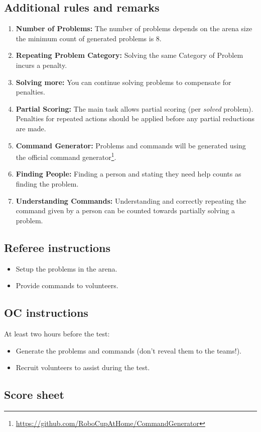 \subsection*{Additional rules and remarks}
\begin{enumerate}[nosep]
	\item \textbf{Number of Problems:} The number of problems depends on the arena size the minimum count of generated problems is 8.
	\item \textbf{Repeating Problem Category:} Solving the same Category of Problem incurs a penalty. 
	\item \textbf{Solving more:} You can continue solving problems to compensate for penalties.
	\item \textbf{Partial Scoring:} The main task allows partial scoring (per \emph{solved} problem). Penalties for repeated actions should be applied before any partial reductions are made.
	\item \textbf{Command Generator:} Problems and commands will be generated using the official command generator\footnote{\url{https://github.com/RoboCupAtHome/CommandGenerator}}.
	\item \textbf{Finding People:} Finding a person and stating they need help counts as finding the problem.
	\item \textbf{Understanding Commands:} Understanding and correctly repeating the command given by a person can be counted towards partially solving a problem.
\end{enumerate}

\subsection*{Referee instructions}
\begin{itemize}
	\item Setup the problems in the arena.
	\item Provide commands to volunteers.
\end{itemize}

\subsection*{OC instructions}

At least two hours before the test:
\begin{itemize}
	\item Generate the problems and commands (don't reveal them to the teams!).
	\item Recruit volunteers to assist during the test.
\end{itemize}


\subsection*{Score sheet}


